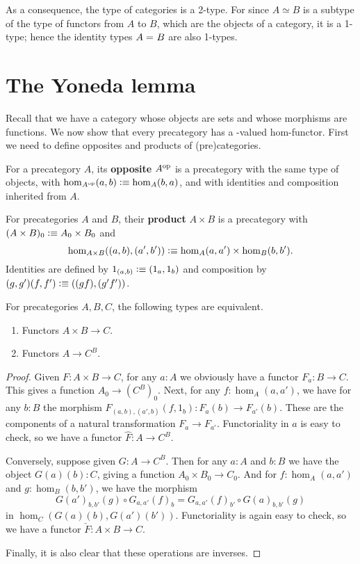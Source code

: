 As a consequence, the type of categories is a 2-type.
For since $A\simeq B$ is a subtype of the type of functors from $A$ to $B$, which are the objects of a category, it is a 1-type; hence the identity types $A =_{} B$ are also 1-types.


\section{The Yoneda lemma}
\label{sec:yoneda}

Recall that we have a category \uset whose objects are sets and whose morphisms are functions.
We now show that every precategory has a \uset-valued hom-functor.
First we need to define opposites and products of (pre)categories.

\begin{defn}
  For a precategory $A$, its \textbf{opposite} $A^{\textrm{op}}$ is a precategory with the same type of objects, with $\hom_{A^{\textrm{op}}}(a,b) \vcentcolon\equiv \hom_A(b,a)$, and with identities and composition inherited from $A$.
\end{defn}

\begin{defn}
  For precategories $A$ and $B$, their \textbf{product} $A\times B$ is a precategory with $(A\times B)_0 \vcentcolon\equiv A_0 \times B_0$ and
  \[\hom_{A\times B}((a,b),(a',b')) \vcentcolon\equiv \hom_A(a,a') \times \hom_B(b,b').\]
  Identities are defined by $1_{(a,b)}\vcentcolon\equiv (1_a,1_b)$ and composition by $(g,g')(f,f') \vcentcolon\equiv ((gf),(g'f'))$.
\end{defn}

\begin{lem}\label{ct:functorexpadj}
  For precategories $A,B,C$, the following types are equivalent.
  \begin{enumerate}
  \item Functors $A\times B\to C$.
  \item Functors $A\to C^B$.
  \end{enumerate}
\end{lem}
\begin{proof}
  Given $F:A\times B\to C$, for any $a:A$ we obviously have a functor $F_a : B\to C$.
  This gives a function $A_0 \to (C^B)_0$.
  Next, for any $f:\hom_A(a,a')$, we have for any $b:B$ the morphism $F_{(a,b),(a',b)}(f,1_b):F_a(b) \to F_{a'}(b)$.
  These are the components of a natural transformation $F_a \to F_{a'}$.
  Functoriality in $a$ is easy to check, so we have a functor $\hat{F}:A\to C^B$.

  Conversely, suppose given $G:A\to C^B$.
  Then for any $a:A$ and $b:B$ we have the object $G(a)(b):C$, giving a function $A_0 \times B_0 \to C_0$.
  And for $f:\hom_A(a,a')$ and $g:\hom_B(b,b')$, we have the morphism
  \begin{equation*}
     G(a')_{b,b'}(g)\circ G_{a,a'}(f)_b = G_{a,a'}(f)_{b'} \circ  G(a)_{b,b'}(g)
  \end{equation*}
  in $\hom_C(G(a)(b), G(a')(b'))$.
  Functoriality is again easy to check, so we have a functor $\check{F}:A\times B \to C$.

  Finally, it is also clear that these operations are inverses.
\end{proof}

